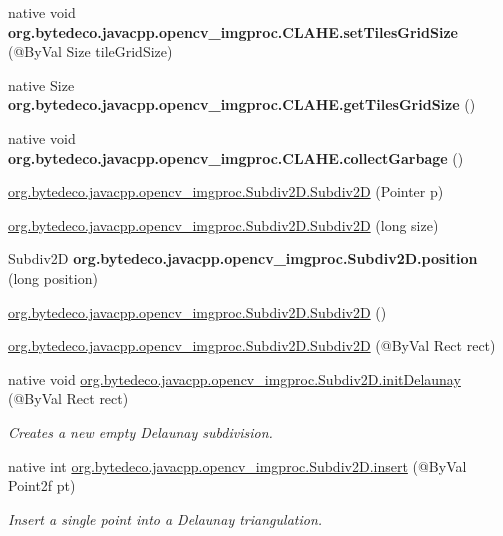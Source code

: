 \begin{DoxyCompactItemize}
native void {\bfseries org.\+bytedeco.\+javacpp.\+opencv\+\_\+imgproc.\+C\+L\+A\+H\+E.\+set\+Tiles\+Grid\+Size} (@By\+Val Size tile\+Grid\+Size)
\item 
\mbox{\label{group__imgproc_gae118ee734cd113613cd846a2513a7d35}} 
native Size {\bfseries org.\+bytedeco.\+javacpp.\+opencv\+\_\+imgproc.\+C\+L\+A\+H\+E.\+get\+Tiles\+Grid\+Size} ()
\item 
\mbox{\label{group__imgproc_ga5f07a495c61937e32ddabd7414000752}} 
native void {\bfseries org.\+bytedeco.\+javacpp.\+opencv\+\_\+imgproc.\+C\+L\+A\+H\+E.\+collect\+Garbage} ()
\item 
\hyperlink{group__imgproc_ga223915a9b07b19809dcae507f071bd73}{org.\+bytedeco.\+javacpp.\+opencv\+\_\+imgproc.\+Subdiv2\+D.\+Subdiv2D} (Pointer p)
\item 
\hyperlink{group__imgproc_ga3b06b65ff3cb26053cb1cea3a2dc3a0c}{org.\+bytedeco.\+javacpp.\+opencv\+\_\+imgproc.\+Subdiv2\+D.\+Subdiv2D} (long size)
\item 
\mbox{\label{group__imgproc_ga6581e20ac0802c75d91b12249f2ec7de}} 
Subdiv2D {\bfseries org.\+bytedeco.\+javacpp.\+opencv\+\_\+imgproc.\+Subdiv2\+D.\+position} (long position)
\item 
\hyperlink{group__imgproc_gae59447279a4317ac1ec79b5c0f3b8f4d}{org.\+bytedeco.\+javacpp.\+opencv\+\_\+imgproc.\+Subdiv2\+D.\+Subdiv2D} ()
\item 
\hyperlink{group__imgproc_ga07dbdb939b272f64ee69ec85f251b92d}{org.\+bytedeco.\+javacpp.\+opencv\+\_\+imgproc.\+Subdiv2\+D.\+Subdiv2D} (@By\+Val Rect rect)
\item 
native void \hyperlink{group__imgproc_gac0bcff66e719b85805c3ccbdd59759a8}{org.\+bytedeco.\+javacpp.\+opencv\+\_\+imgproc.\+Subdiv2\+D.\+init\+Delaunay} (@By\+Val Rect rect)
\begin{DoxyCompactList}\small\item\em Creates a new empty Delaunay subdivision. \end{DoxyCompactList}\item 
native int \hyperlink{group__imgproc_ga910bf3955c8f70eb87b6191941a1d509}{org.\+bytedeco.\+javacpp.\+opencv\+\_\+imgproc.\+Subdiv2\+D.\+insert} (@By\+Val Point2f pt)
\begin{DoxyCompactList}\small\item\em Insert a single point into a Delaunay triangulation. \end{DoxyCompactList}\item 

\end{DoxyCompactItemize}
